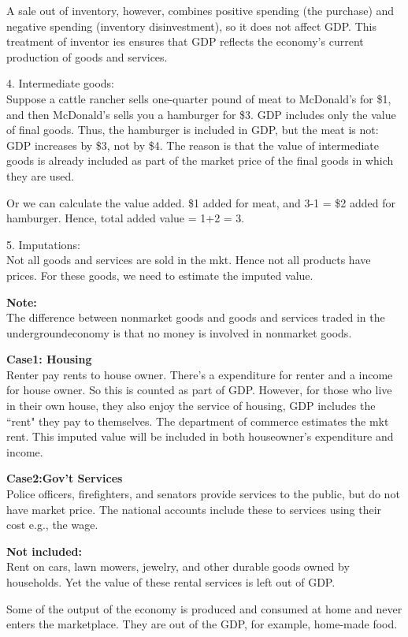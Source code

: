 \documentclass[12pt]{article}
\begin{document}
A sale out of inventory, however, combines positive spending (the purchase) and negative
spending (inventory disinvestment), so it does not affect GDP. This treatment of inventor
ies ensures that GDP reflects the economy’s current production of goods and services.


4. Intermediate goods:\\
Suppose a cattle rancher sells one-quarter pound of meat to McDonald’s for \$1, and 
then McDonald’s sells you a hamburger for \$3. 
GDP includes only the value of final goods. Thus, the hamburger is included in GDP, 
but the meat is not: GDP increases by \$3, not by \$4.
The reason is that the value of intermediate goods is already included as part of the 
market price of the final goods in which they are used.

Or we can calculate the value added. \$1 added for meat, and 3-1 = \$2 added for 
hamburger. Hence, total added value = 1+2 = 3.


5. Imputations:\\
Not all goods and services are sold in the mkt. Hence not all products have prices.
For these goods, we need to estimate the imputed value.


{\textbf {Note:}}\\
The difference between nonmarket goods and goods and services traded in the undergroundeconomy is that no money is involved in nonmarket goods.

{\textbf {Case1: Housing}}\\
Renter pay rents to house owner. There's a expenditure for renter and a income for 
house owner. So this is counted as part of GDP. However, for those who live in their
own house, they also enjoy the service of housing, GDP includes the ``rent" they
pay to themselves. The department of commerce estimates the mkt rent. This imputed
value will be included in both houseowner's expenditure and income.


{\textbf {Case2:Gov't Services}}\\
Police officers, firefighters, and senators provide services to the public, but do not
have market price. The national accounts include these to services using their cost
e.g., the wage.

{\textbf {Not included:}}\\
Rent on cars, lawn mowers, jewelry, and other durable goods owned by households.
Yet the value of these rental services is left out of GDP.

Some of the output of the economy is produced and consumed at home and never enters the 
marketplace. They are out of the GDP, for example, home-made food.
\end{document}
